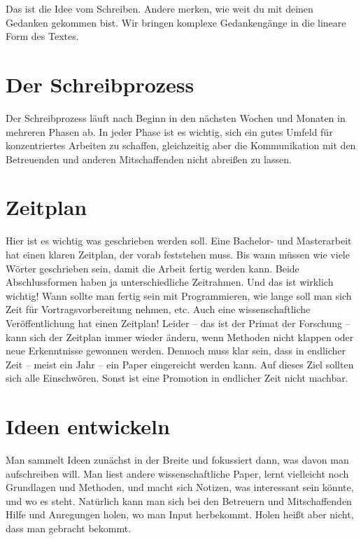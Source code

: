 \documentclass[
  letterpaper,
]{scrbook}
\begin{document}
Das ist die Idee vom Schreiben. Andere merken, wie weit du mit deinen
Gedanken gekommen bist. Wir bringen komplexe Gedankengänge in die
lineare Form des Textes.

\hypertarget{der-schreibprozess}{%
\section{Der Schreibprozess}\label{der-schreibprozess}}

Der Schreibprozess läuft nach Beginn in den nächsten Wochen und Monaten
in mehreren Phasen ab. In jeder Phase ist es wichtig, sich ein gutes
Umfeld für konzentriertes Arbeiten zu schaffen, gleichzeitig aber die
Kommunikation mit den Betreuenden und anderen Mitschaffenden nicht
abreißen zu lassen.

\hypertarget{zeitplan}{%
\section{Zeitplan}\label{zeitplan}}

Hier ist es wichtig was geschrieben werden soll. Eine Bachelor- und
Masterarbeit hat einen klaren Zeitplan, der vorab feststehen muss. Bis
wann müssen wie viele Wörter geschrieben sein, damit die Arbeit fertig
werden kann. Beide Abschlussformen haben ja unterschiedliche Zeitrahmen.
Und das ist wirklich wichtig! Wann sollte man fertig sein mit
Programmieren, wie lange soll man sich Zeit für Vortragsvorbereitung
nehmen, etc. Auch eine wissenschaftliche Veröffentlichung hat einen
Zeitplan! Leider -- das ist der Primat der Forschung -- kann sich der
Zeitplan immer wieder ändern, wenn Methoden nicht klappen oder neue
Erkenntnisse gewonnen werden. Dennoch muss klar sein, dass in endlicher
Zeit -- meist ein Jahr -- ein Paper eingereicht werden kann. Auf dieses
Ziel sollten sich alle Einschwören. Sonst ist eine Promotion in
endlicher Zeit nicht machbar.

\hypertarget{ideen-entwickeln}{%
\section{Ideen entwickeln}\label{ideen-entwickeln}}

Man sammelt Ideen zunächst in der Breite und fokussiert dann, was davon
man aufschreiben will. Man liest andere wissenschaftliche Paper, lernt
vielleicht noch Grundlagen und Methoden, und macht sich Notizen, was
interessant sein könnte, und wo es steht. Natürlich kann man sich bei
den Betreuern und Mitschaffenden Hilfe und Anregungen holen, wo man
Input herbekommt. Holen heißt aber nicht, dass man gebracht bekommt.
\end{document}

